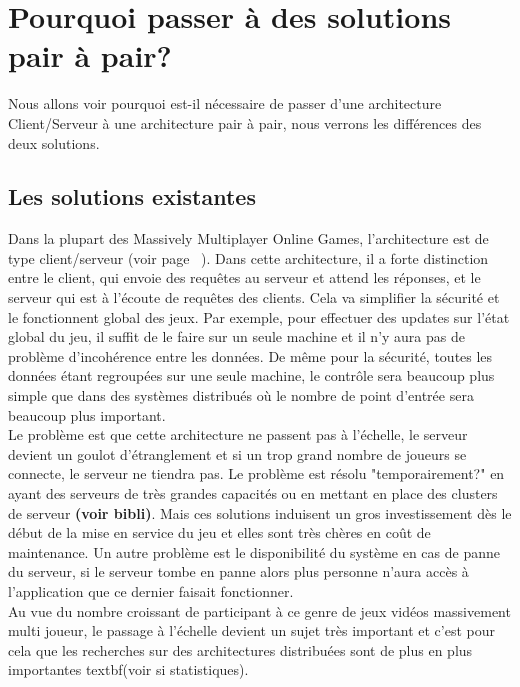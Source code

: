 \section{Pourquoi passer à des solutions pair à pair?}
	Nous allons voir pourquoi est-il nécessaire de passer d'une architecture Client/Serveur à une architecture pair à pair, nous verrons les différences des deux solutions.
	\subsection{Les solutions existantes}
	Dans la plupart des Massively Multiplayer Online Games, l'architecture est de type client/serveur (voir page ~\pageref{P2P/ClServ}). Dans cette architecture, il a forte distinction entre le client, qui envoie des requêtes au serveur et attend les réponses, et le serveur qui est à l'écoute de requêtes des clients. Cela va simplifier la sécurité et le fonctionnent global des jeux. Par exemple, pour effectuer des updates sur l'état global du jeu, il suffit de le faire sur un seule machine et il n'y aura pas de problème d'incohérence entre les données. De même pour la sécurité, toutes les données étant regroupées sur une seule machine, le contrôle sera beaucoup plus simple que dans des systèmes distribués où le nombre de point d'entrée sera beaucoup plus important. \\
	Le problème est que cette architecture ne passent pas à l'échelle, le serveur devient un goulot d'étranglement et si un trop grand nombre de joueurs se connecte, le serveur ne tiendra pas. Le problème est résolu "temporairement?" en ayant des serveurs de très grandes capacités ou en mettant en place des clusters de serveur \textbf{(voir bibli)}. Mais ces solutions induisent un gros investissement dès le début de la mise en service du jeu et elles sont très chères en coût de maintenance. Un autre problème est le disponibilité du système en cas de panne du serveur, si le serveur tombe en panne alors plus personne n'aura accès à l'application que ce dernier faisait fonctionner. \\
	Au vue du nombre croissant de participant à ce genre de jeux vidéos massivement multi joueur, le passage à l'échelle devient un sujet très important et c'est pour cela que les recherches sur des architectures distribuées sont de plus en plus importantes textbf{(voir si statistiques)}. \\
\newline


